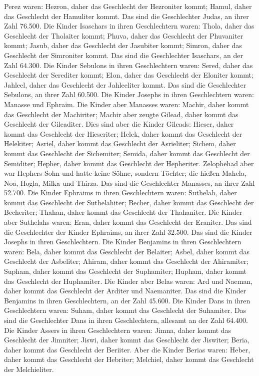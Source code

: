 Perez waren: Hezron, daher das Geschlecht der Hezroniter kommt; Hamul,
daher das Geschlecht der Hamuliter kommt.  Das sind die
Geschlechter Judas, an ihrer Zahl 76.500.  Die Kinder
Isaschars in ihren Geschlechtern waren: Thola, daher das Geschlecht der
Tholaiter kommt; Phuva, daher das Geschlecht der Phuvaniter kommt;
 Jasub, daher das Geschlecht der Jasubiter kommt; Simron,
daher das Geschlecht der Simroniter kommt.  Das sind die
Geschlechter Isaschars, an der Zahl 64.300.  Die Kinder
Sebulons in ihren Geschlechtern waren: Sered, daher das Geschlecht der
Serediter kommt; Elon, daher das Geschlecht der Eloniter kommt; Jahleel,
daher das Geschlecht der Jahleeliter kommt.  Das sind die
Geschlechter Sebulons, an ihrer Zahl 60.500.  Die Kinder
Josephs in ihren Geschlechtern waren: Manasse und Ephraim.
 Die Kinder aber Manasses waren: Machir, daher kommt das
Geschlecht der Machiriter; Machir aber zeugte Gilead, daher kommt das
Geschlecht der Gileaditer.  Dies sind aber die Kinder
Gileads: Hieser, daher kommt das Geschlecht der Hieseriter; Helek, daher
kommt das Geschlecht der Helekiter;  Asriel, daher kommt
das Geschlecht der Asrieliter; Sichem, daher kommt das Geschlecht der
Sichemiter;  Semida, daher kommt das Geschlecht der
Semiditer; Hepher, daher kommt das Geschlecht der Hepheriter.
 Zelophehad aber war Hephers Sohn und hatte keine Söhne,
sondern Töchter; die hießen Mahela, Noa, Hogla, Milka und Thirza.
 Das sind die Geschlechter Manasses, an ihrer Zahl
52.700.  Die Kinder Ephraims in ihren Geschlechtern
waren: Suthelah, daher kommt das Geschlecht der Suthelahiter; Becher,
daher kommt das Geschlecht der Becheriter; Thahan, daher kommt das
Geschlecht der Thahaniter.  Die Kinder aber Suthelahs
waren: Eran, daher kommt das Geschlecht der Eraniter. 
Das sind die Geschlechter der Kinder Ephraims, an ihrer Zahl 32.500. Das
sind die Kinder Josephs in ihren Geschlechtern.  Die
Kinder Benjamins in ihren Geschlechtern waren: Bela, daher kommt das
Geschlecht der Belaiter; Asbel, daher kommt das Geschlecht der
Asbeliter; Ahiram, daher kommt das Geschlecht der Ahiramiter;
 Supham, daher kommt das Geschlecht der Suphamiter;
Hupham, daher kommt das Geschlecht der Huphamiter.  Die
Kinder aber Belas waren: Ard und Naeman, daher kommt das Geschlecht der
Arditer und Naemaniter.  Das sind die Kinder Benjamins in
ihren Geschlechtern, an der Zahl 45.600.  Die Kinder Dans
in ihren Geschlechtern waren: Suham, daher kommt das Geschlecht der
Suhamiter.  Das sind die Geschlechter Dans in ihren
Geschlechtern, allesamt an der Zahl 64.400.  Die Kinder
Assers in ihren Geschlechtern waren: Jimna, daher kommt das Geschlecht
der Jimniter; Jiswi, daher kommt das Geschlecht der Jiswiter; Beria,
daher kommt das Geschlecht der Beriiter.  Aber die Kinder
Berias waren: Heber, daher kommt das Geschlecht der Hebriter; Melchiel,
daher kommt das Geschlecht der Melchieliter.


